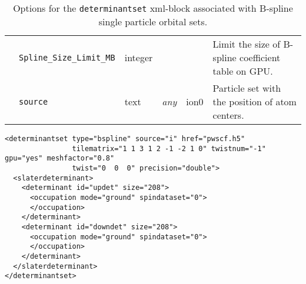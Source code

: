 \begin{table}[h]
\begin{center}
\begin{tabularx}{\textwidth}{l l l l l l }
   &   \texttt{Spline\_Size\_Limit\_MB}  &  integer            &                 &             &  Limit the size of B-spline coefficient table on GPU. \\
   &   \texttt{source}               &  text               &   \textit{any}    &  ion0        & Particle set with the position of atom centers. \\
  \hline
\end{tabularx}
\end{center}
\caption{Options for the \texttt{determinantset} xml-block associated with B-spline single particle orbital sets.}
\label{table:splineSPOs}
\end{table}


\begin{lstlisting}[caption=All electron Hamiltonian XML element.\label{listing:splineSPOs}]
<determinantset type="bspline" source="i" href="pwscf.h5"
                tilematrix="1 1 3 1 2 -1 -2 1 0" twistnum="-1" gpu="yes" meshfactor="0.8"
                twist="0  0  0" precision="double">
  <slaterdeterminant>
    <determinant id="updet" size="208">
      <occupation mode="ground" spindataset="0">
      </occupation>
    </determinant>
    <determinant id="downdet" size="208">
      <occupation mode="ground" spindataset="0">
      </occupation>
    </determinant>
  </slaterdeterminant>
</determinantset>
\end{lstlisting}

